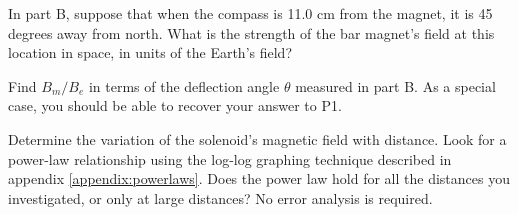 \prelab

\prelabquestion  In part B, suppose that
when the compass is 11.0 cm from the magnet, it is
45 degrees away from north. What is
the strength of the bar magnet's field at this location in space,
in units of the Earth's field?

\prelabquestion Find $B_m/B_e$ in terms of the deflection angle $\theta$ measured in part B. As a special
case, you should be able to recover your answer to P1.

\analysis

Determine the variation of the solenoid's magnetic
field with distance. 
Look for a power-law relationship using the log-log graphing technique described in 
appendix \ref{appendix:powerlaws}. Does the power law hold for
all the distances you investigated, or only at large distances?
No error analysis is required.

